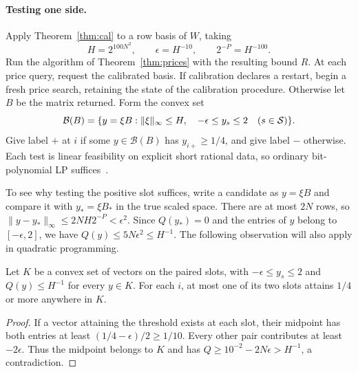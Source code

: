 \paragraph{Testing one side.}
Apply Theorem~\ref{thm:cal} to a row basis of \(W\), taking
\begin{equation}\label{eq:labelpars}
 H=2^{100N^2},\qquad \epsilon=H^{-10},\qquad 2^{-P}=H^{-100}.
\end{equation}
Run the algorithm of Theorem~\ref{thm:prices} with the resulting bound
\(R\). At each price query, request the calibrated basis. If calibration
declares a restart, begin a fresh price search, retaining the state of
the calibration procedure. Otherwise let \(B\) be the matrix returned.
Form the convex set
\begin{equation}\label{eq:box}
 \mathcal B(B)=\{y=\xi B:\|\xi\|_\infty\le H,\quad
                     -\epsilon\le y_s\le2\quad(s\in\mathcal S)\}.
\end{equation}
Give label \(+\) at \(i\) if some \(y\in\mathcal B(B)\) has
\(y_{i+}\ge1/4\), and give label \(-\) otherwise.
Each test is linear feasibility on explicit short rational data, so
ordinary bit-polynomial LP suffices~\cite{Khach,GLS}.

To see why testing the positive slot suffices, write a candidate
as \(y=\xi B\) and compare it with \(y_*=\xi B_*\) in the true
scaled space. There are at most \(2N\) rows, so
\(\|y-y_*\|_\infty\le 2NH2^{-P}<\epsilon^2\).
Since \(Q(y_*)=0\) and the entries of \(y\) belong to
\([-\epsilon,2]\), we have \(Q(y)\le5N\epsilon^2\le H^{-1}\).
The following observation will also apply in quadratic programming.

\begin{lemma}\label{lem:mid}
Let \(K\) be a convex set of vectors on the paired slots, with
\(-\epsilon\le y_s\le2\) and \(Q(y)\le H^{-1}\) for every \(y\in K\).
For each \(i\), at most one of its two slots attains \(1/4\) or more
anywhere in \(K\).
\end{lemma}
\begin{proof}
If a vector attaining the threshold exists at each slot, their
midpoint has both entries at least \((1/4-\epsilon)/2\ge1/10\).
Every other pair contributes at least \(-2\epsilon\). Thus the
midpoint belongs to \(K\) and has
\(Q\ge10^{-2}-2N\epsilon>H^{-1}\), a contradiction.
\end{proof}


